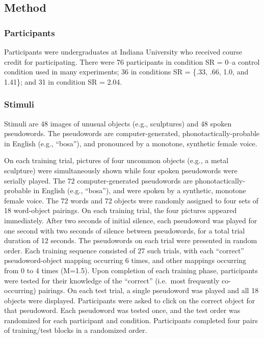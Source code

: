 \documentclass[man,floatsintext]{apa6}
\begin{document}
\hypertarget{method}{%
\subsection{Method}\label{method}}

\hypertarget{participants}{%
\subsubsection{Participants}\label{participants}}

Participants were undergraduates at Indiana University who received course credit for participating.
There were 76 participants in condition SR = 0--a control condition used in many experiments; 36 in conditions SR = \{.33, .66, 1.0, and 1.41\}; and 31 in condition SR = 2.04.

\hypertarget{stimuli}{%
\subsubsection{Stimuli}\label{stimuli}}

Stimuli are 48 images of unusual objects (e.g., sculptures) and 48 spoken pseudowords. The pseudowords are computer-generated, phonotactically-probable in English (e.g., \enquote{bosa}), and pronounced by a monotone, synthetic female voice.

On each training trial, pictures of four uncommon objects (e.g., a metal sculpture) were simultaneously shown while four spoken pseudowords were serially played.
The 72 computer-generated pseudowords are phonotactically-probable in English (e.g., \enquote{bosa}), and were spoken by a synthetic, monotone female voice.
The 72 words and 72 objects were randomly assigned to four sets of 18 word-object pairings.
On each training trial, the four pictures appeared immediately. After two seconds of initial silence, each pseudoword was played for one second with two seconds of silence between pseudowords, for a total trial duration of 12 seconds.
The pseudowords on each trial were presented in random order.
Each training sequence consisted of 27 such trials, with each \enquote{correct} pseudoword-object mapping occurring 6 times, and other mappings occurring from 0 to 4 times (M=1.5).
Upon completion of each training phase, participants were tested for their knowledge of the \enquote{correct} (i.e.~most frequently co-occurring) pairings.
On each test trial, a single pseudoword was played and all 18 objects were displayed.
Participants were asked to click on the correct object for that pseudoword.
Each pseudoword was tested once, and the test order was randomized for each participant and condition.
Participants completed four pairs of training/test blocks in a randomized order.
\end{document}
